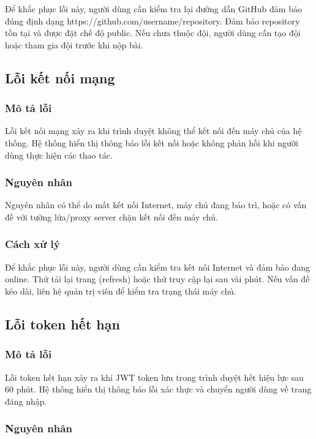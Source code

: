 Để khắc phục lỗi này, người dùng cần kiểm tra lại đường dẫn GitHub đảm bảo đúng định dạng https://github.com/username/repository. Đảm bảo repository tồn tại và được đặt chế độ public. Nếu chưa thuộc đội, người dùng cần tạo đội hoặc tham gia đội trước khi nộp bài.

\subsection{Lỗi kết nối mạng}

\subsubsection{Mô tả lỗi}

Lỗi kết nối mạng xảy ra khi trình duyệt không thể kết nối đến máy chủ của hệ thống. Hệ thống hiển thị thông báo lỗi kết nối hoặc không phản hồi khi người dùng thực hiện các thao tác.

\subsubsection{Nguyên nhân}

Nguyên nhân có thể do mất kết nối Internet, máy chủ đang bảo trì, hoặc có vấn đề với tường lửa/proxy server chặn kết nối đến máy chủ.

\subsubsection{Cách xử lý}

Để khắc phục lỗi này, người dùng cần kiểm tra kết nối Internet và đảm bảo đang online. Thử tải lại trang (refresh) hoặc thử truy cập lại sau vài phút. Nếu vấn đề kéo dài, liên hệ quản trị viên để kiểm tra trạng thái máy chủ.

\subsection{Lỗi token hết hạn}

\subsubsection{Mô tả lỗi}

Lỗi token hết hạn xảy ra khi JWT token lưu trong trình duyệt hết hiệu lực sau 60 phút. Hệ thống hiển thị thông báo lỗi xác thực và chuyển người dùng về trang đăng nhập.

\subsubsection{Nguyên nhân}

